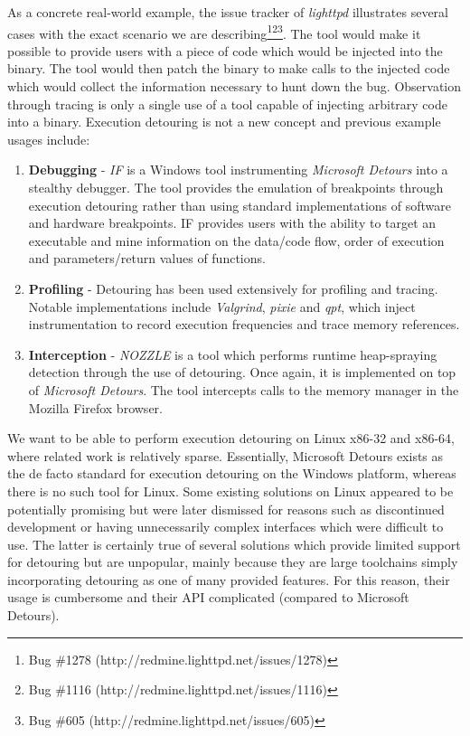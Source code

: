 As a concrete real-world example, the issue tracker of \emph{lighttpd} illustrates several cases with the exact scenario we are describing\footnote{Bug \#1278 (http://redmine.lighttpd.net/issues/1278)}\footnote{Bug \#1116 (http://redmine.lighttpd.net/issues/1116)}\footnote{Bug \#605 (http://redmine.lighttpd.net/issues/605)}. The tool would make it possible to provide users with a piece of code which would be injected into the binary. The tool would then patch the binary to make calls to the injected code which would collect the information necessary to hunt down the bug. Observation through tracing is only a single use of a tool capable of injecting arbitrary code into a binary. Execution detouring is not a new concept and previous example usages include:

\begin{enumerate}
 \item \textbf{Debugging} - \emph{IF} is a Windows tool instrumenting \emph{Microsoft Detours} into a stealthy debugger. The tool provides the emulation of breakpoints through execution detouring rather than using standard implementations of software and hardware breakpoints\cite{IF}. IF provides users with the ability to target an executable and mine information on the data/code flow, order of execution and parameters/return values of functions. 
 \item \textbf{Profiling} - Detouring has been used extensively for profiling and tracing. Notable implementations include \emph{Valgrind}, \emph{pixie} and \emph{qpt}\cite{qpt,qpt_pixie,valgrind}, which inject instrumentation to record execution frequencies and trace memory references.
 \item \textbf{Interception} - \emph{NOZZLE} is a tool which performs runtime heap-spraying detection\cite{nozzle} through the use of detouring. Once again, it is implemented on top of \emph{Microsoft Detours}. The tool intercepts calls to the memory manager in the Mozilla Firefox browser.
\end{enumerate}

We want to be able to perform execution detouring on Linux x86-32 and x86-64, where related work is relatively sparse. Essentially, Microsoft Detours exists as the de facto standard for execution detouring on the Windows platform, whereas there is no such tool for Linux. Some existing solutions on Linux appeared to be potentially promising but were later dismissed for reasons such as discontinued development or having unnecessarily complex interfaces which were difficult to use. The latter is certainly true of several solutions which provide limited support for detouring but are unpopular, mainly because they are large toolchains simply incorporating detouring as one of many provided features. For this reason, their usage is cumbersome and their API complicated (compared to Microsoft Detours).

